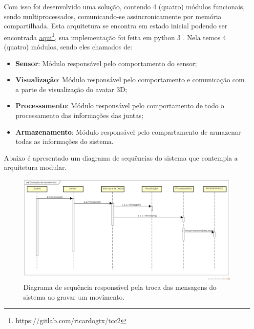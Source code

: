 Com isso foi desenvolvido uma solução, contendo 4 (quatro) módulos funcionais, sendo multiprocessados, comunicando-se assincronicamente por
memória compartilhada. Esta arquitetura se encontra em estado inicial podendo ser encontrada \href{https://gitlab.com/ricardogtx/tcc2}{aqui}\footnote{https://gitlab.com/ricardogtx/tcc2}, sua implementação
foi feita em python 3 \cite{pythondoc}. Nela temos 4 (quatro) módulos, sendo eles chamados de:

\begin{itemize}
  \item \textbf{Sensor}: Módulo responsável pelo comportamento do sensor;
  \item \textbf{Visualização}: Módulo responsável pelo comportamento e comunicação com a parte de visualização do avatar 3D;
  \item \textbf{Processamento}: Módulo responsável pelo comportamento de todo o processamento das informações das juntas;
  \item \textbf{Armazenamento}: Módulo responsável pelo compartamento de armazenar todas as informações do sistema.
\end{itemize}

Abaixo é apresentado um diagrama de sequências do sistema que contempla a arquitetura modular.

\begin{figure}[H]
\centering
\includegraphics [keepaspectratio=true,scale=0.37]{figuras/dsPythonGravacao.eps}
\caption{Diagrama de sequência responsável pela troca das mensagens do sistema ao gravar um movimento.}
\label{img:dspythong}
\end{figure}

